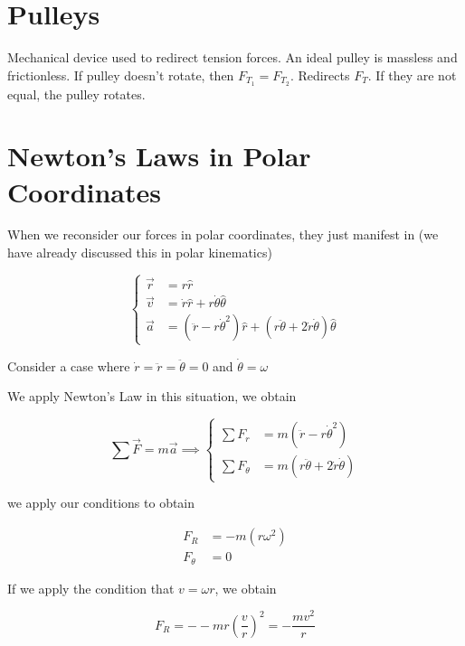 \section{Pulleys}

Mechanical device used to redirect tension forces. An ideal pulley is massless and frictionless. If pulley doesn't rotate, then $F_{T_1} = F_{T_2}$. Redirects $F_T$. If they are not equal, the pulley rotates.

\section{Newton's Laws in Polar Coordinates}

When we reconsider our forces in polar coordinates, they just manifest in (we have already discussed this in polar kinematics)

\begin{equation}
	\begin{cases}
		\vec r &= r \hat r\\
		\vec v &= \dot r \hat r + r \dot \theta \hat \theta\\
		\vec a &= (\ddot r - r \dot \theta^2) \hat r + (r \ddot \theta + 2 \dot r \dot \theta) \hat \theta
	\end{cases}
\end{equation}

\begin{example}
	Consider a case where $\dot r = \ddot r = \ddot \theta = 0$ and $\dot \theta = \omega$
\end{example}

\begin{sol}
	We apply Newton's Law in this situation, we obtain 

	\begin{equation}
		\sum \vec F = m \vec a \implies \begin{cases}
			\sum F_r &= m(\ddot r - r \dot \theta^2)\\
			\sum F_\theta &= m(r\ddot \theta + 2 \dot r \dot \theta)
		\end{cases}
	\end{equation}

	we apply our conditions to obtain

	\begin{align}
		F_R &= - m(r\omega^2)\\
		F_\theta &= 0
	\end{align}

	If we apply the condition that $v = \omega r$, we obtain

	\begin{equation}
		F_R = - -m r \left(\frac{v}{r}\right)^2 = - \frac{mv^2}{r}
	\end{equation}
\end{sol}

